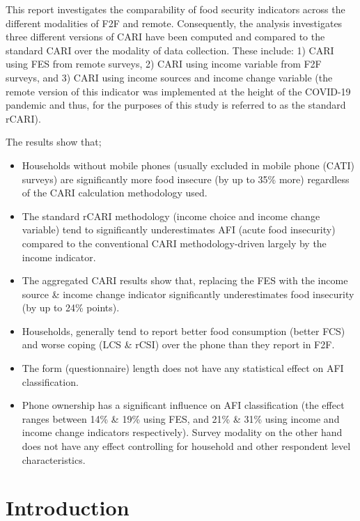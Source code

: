 \documentclass[11pt,harvard]{article}
\begin{document}
	This report investigates the comparability of food security indicators across the different modalities of F2F and remote. Consequently, the analysis investigates three different versions of CARI have been computed and compared to the standard CARI over the modality of data collection. These include: 1) CARI using FES from remote surveys, 2) CARI using income variable from F2F surveys, and 3) CARI using income sources and income change variable (the remote version of this indicator was implemented at the height of the COVID-19 pandemic and thus, for the purposes of this study is referred to as the standard rCARI). 
	
	The results show that; 
	\begin{itemize}
		\item Households without mobile phones (usually excluded in mobile phone (CATI) surveys) are significantly more food insecure (by up to 35\% more) regardless of the CARI calculation methodology used. 
		\item The standard rCARI methodology (income choice and income change variable) tend to significantly underestimates AFI (acute food insecurity) compared to the conventional CARI methodology-driven largely by the income indicator.
		\item The aggregated CARI results show that, replacing the FES with the income source \& income change indicator significantly underestimates food insecurity (by up to 24\% points).
		\item Households, generally tend to report better food consumption (better FCS) and worse coping (LCS \& rCSI) over the phone than they report in F2F.
		\item The form (questionnaire) length does not have any statistical effect on AFI classification.
		\item Phone ownership has a significant influence on AFI classification (the effect ranges between 14\% \& 19\% using FES, and 21\% \& 31\% using income and income change indicators respectively). Survey modality on the other hand does not have any effect controlling for household and other respondent level characteristics.
	\end{itemize}
	
	\pagebreak
	
	\section{Introduction}
	
\end{document}
